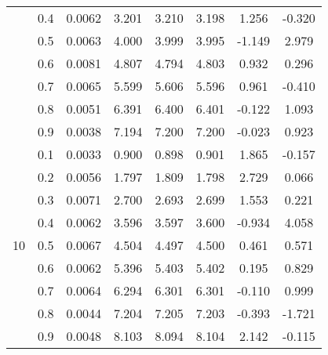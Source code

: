 \documentclass[11pt,a4paper]{report}
\begin{document}
\begin{longtable}{ | c | c || c | c | c | c | c | c | }
 & 0.4 & 0.0062 & 3.201 & 3.210 & 3.198 & 1.256 & -0.320 \\
 & 0.5 & 0.0063 & 4.000 & 3.999 & 3.995 & -1.149 & 2.979 \\
 & 0.6 & 0.0081 & 4.807 & 4.794 & 4.803 & 0.932 & 0.296 \\
 & 0.7 & 0.0065 & 5.599 & 5.606 & 5.596 & 0.961 & -0.410 \\
 & 0.8 & 0.0051 & 6.391 & 6.400 & 6.401 & -0.122 & 1.093 \\
 & 0.9 & 0.0038 & 7.194 & 7.200 & 7.200 & -0.023 & 0.923 \\
 \hline
\multirow{9}{*}{10} & 0.1 & 0.0033 & 0.900 & 0.898 & 0.901 & 1.865 & -0.157 \\
 & 0.2 & 0.0056 & 1.797 & 1.809 & 1.798 & 2.729 & 0.066 \\
 & 0.3 & 0.0071 & 2.700 & 2.693 & 2.699 & 1.553 & 0.221 \\
 & 0.4 & 0.0062 & 3.596 & 3.597 & 3.600 & -0.934 & 4.058 \\
 & 0.5 & 0.0067 & 4.504 & 4.497 & 4.500 & 0.461 & 0.571 \\
 & 0.6 & 0.0062 & 5.396 & 5.403 & 5.402 & 0.195 & 0.829 \\
 & 0.7 & 0.0064 & 6.294 & 6.301 & 6.301 & -0.110 & 0.999 \\
 & 0.8 & 0.0044 & 7.204 & 7.205 & 7.203 & -0.393 & -1.721 \\
 & 0.9 & 0.0048 & 8.103 & 8.094 & 8.104 & 2.142 & -0.115 \\
 \hline
\hline
\end{longtable}
\end{document}
